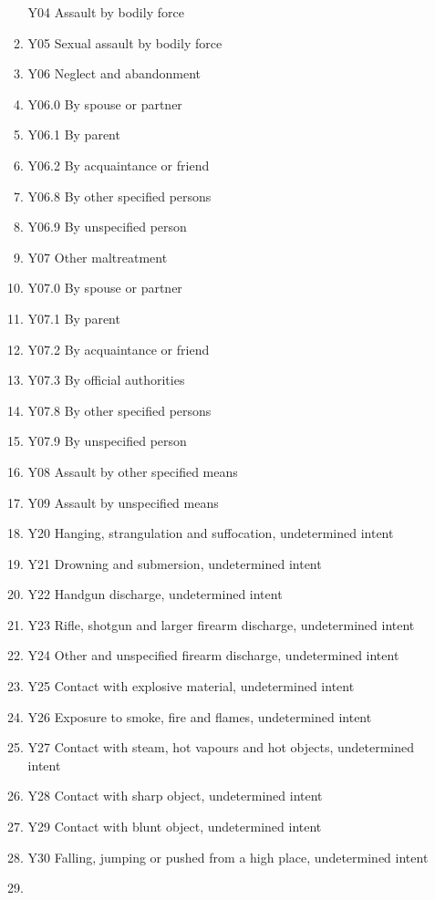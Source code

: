 \documentclass[
]{scrartcl}
\begin{document}
\begin{itemize}
\begin{enumerate}
    Y04 Assault by bodily force
  \item
    Y05 Sexual assault by bodily force
  \item
    Y06 Neglect and abandonment
  \item
    Y06.0 By spouse or partner
  \item
    Y06.1 By parent
  \item
    Y06.2 By acquaintance or friend
  \item
    Y06.8 By other specified persons
  \item
    Y06.9 By unspecified person
  \item
    Y07 Other maltreatment
  \item
    Y07.0 By spouse or partner
  \item
    Y07.1 By parent
  \item
    Y07.2 By acquaintance or friend
  \item
    Y07.3 By official authorities
  \item
    Y07.8 By other specified persons
  \item
    Y07.9 By unspecified person
  \item
    Y08 Assault by other specified means
  \item
    Y09 Assault by unspecified means
  \item
    Y20 Hanging, strangulation and suffocation, undetermined intent
  \item
    Y21 Drowning and submersion, undetermined intent
  \item
    Y22 Handgun discharge, undetermined intent
  \item
    Y23 Rifle, shotgun and larger firearm discharge, undetermined intent
  \item
    Y24 Other and unspecified firearm discharge, undetermined intent
  \item
    Y25 Contact with explosive material, undetermined intent
  \item
    Y26 Exposure to smoke, fire and flames, undetermined intent
  \item
    Y27 Contact with steam, hot vapours and hot objects, undetermined
    intent
  \item
    Y28 Contact with sharp object, undetermined intent
  \item
    Y29 Contact with blunt object, undetermined intent
  \item
    Y30 Falling, jumping or pushed from a high place, undetermined
    intent
  \item

\end{enumerate}
\end{itemize}
\end{document}

